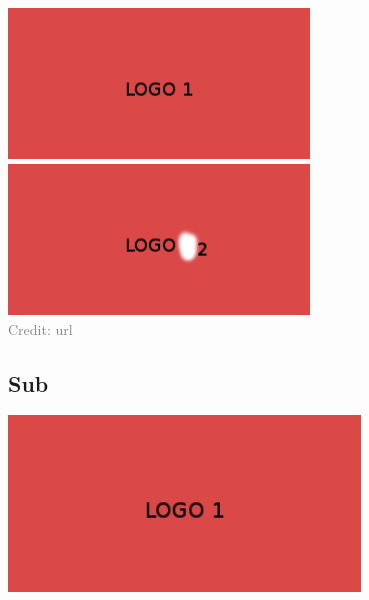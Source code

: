 \begin{frame}
  \begin{center}
    \includegraphics[width=0.6\textwidth]{logo1.jpg}\\
    \bigskip
    \pause
    \includegraphics[width=0.6\textwidth]{logo2.jpg}\\
    \smallskip
    \textcolor{gray}{\tiny Credit: url}
  \end{center}
\end{frame}

\subsection{Sub}
\begin{frame}
  \pause[7]
  \centering \includegraphics[width=0.7\textwidth]{logo1.jpg}
\end{frame}

